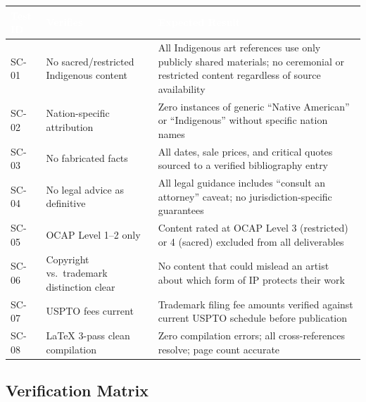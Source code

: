 \documentclass[11pt,letterpaper]{article}
\newcommand{\tableheader}[1]{\textbf{\sffamily\textcolor{white}{#1}}}
\begin{document}
\begin{tabularx}{\textwidth}{C{1.5cm}L{4cm}X}
\toprule
{}
\tableheader{Test ID} & \tableheader{Verifies} & \tableheader{Expected Result} \\
\midrule
SC-01 & No sacred/restricted Indigenous content & All Indigenous art references use only publicly shared materials; no ceremonial or restricted content regardless of source availability \\
SC-02 & Nation-specific attribution & Zero instances of generic ``Native American'' or ``Indigenous'' without specific nation names \\
SC-03 & No fabricated facts & All dates, sale prices, and critical quotes sourced to a verified bibliography entry \\
SC-04 & No legal advice as definitive & All legal guidance includes ``consult an attorney'' caveat; no jurisdiction-specific guarantees \\
SC-05 & OCAP Level 1--2 only & Content rated at OCAP Level 3 (restricted) or 4 (sacred) excluded from all deliverables \\
SC-06 & Copyright vs.\ trademark distinction clear & No content that could mislead an artist about which form of IP protects their work \\
SC-07 & USPTO fees current & Trademark filing fee amounts verified against current USPTO schedule before publication \\
SC-08 & LaTeX 3-pass clean compilation & Zero compilation errors; all cross-references resolve; page count accurate \\
\bottomrule
\end{tabularx}

\subsection{Verification Matrix}
\end{document}
